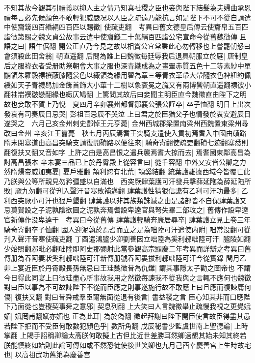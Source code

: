 不知其故今觀其引禮義以抑人主之情乃知真社稷之臣也妾與陛下結髮為夫婦曲承恩禮每言必先候顔色不敢輕犯威嚴况以人臣之疏遠乃能抗言如是陛下不可不從自請遣中使齎錢四百緍絹四百匹以賜徵|{
	使疏吏翻　考異曰舊文德皇后傳云使齎帛五百匹詣徵第賜之魏文貞公故事云遣中使齎錢二十萬絹百匹詣公宅宣命今從舊魏徵傳}
且語之曰|{
	語牛倨翻}
開公正直乃今見之故以相賞公宜常秉此心勿轉移也上嘗罷朝怒曰會須殺此田舍翁|{
	朝直遥翻}
后問為誰上曰魏徵每廷辱我后退具朝服立於庭|{
	唐制皇后之服褘衣者受册助祭朝會大事之服也深青織成為之畫翬赤質五色十二等素紗中單黼領朱羅縠褾襈蔽膝隨裳色以緅領為緣用翟為章三等青衣革帶大帶隨衣色裨紐約佩綬如天子青襪舄加金飾首飾大小華十二樹以象衮冕之旒又有兩博鬢朝直遥翻褾彼小翻袖耑襈皺戀翻緣也緅仄鳩翻}
上驚問其故后曰妾聞主明臣直今魏徵直由陛下之明故也妾敢不賀上乃悅　夏四月辛卯襄州都督鄒襄公張公謹卒|{
	卒子恤翻}
明日上出次發哀有司奏辰日忌哭|{
	彭祖百忌辰不哭泣}
上曰君之於臣猶父子也情發於衷安避辰日遂哭之　六月己亥金州刺史酆悼王元亨薨|{
	金州西城郡梁置南梁州西魏置東梁州尋改曰金州}
辛亥江王囂薨　秋七月丙辰焉耆王突騎支遣使入貢初焉耆入中國由磧路隋末閉塞道由高昌突騎支請復開磧路以便往來|{
	騎奇寄翻使疏吏翻磧七迹翻塞悉則翻復扶又翻又音如字}
上許之由是高昌恨之遣兵襲焉耆大掠而去|{
	焉耆國東鄰高昌為討高昌張本}
辛未宴三品已上於丹霄殿上從容言曰|{
	從千容翻}
中外乂安皆公卿之力然隋煬帝威加夷夏|{
	夏戶雅翻}
頡利跨有北荒|{
	頡奚結翻}
統葉護雄據西域今皆覆亡此乃朕與公等所親見勿矜彊盛以自滿也　西突厥肆葉護可汗發兵擊薛延陁為薛延陁所敗|{
	厥九勿翻可從刋入聲汗音寒敗補邁翻}
肆葉護性猜狠信讒有乙利可汗功最多|{
	乙利西突厥小可汗也狠戶墾翻}
肆葉護以非其族類誅滅之由是諸部皆不自保肆葉護又忌莫賀設之子泥孰陰欲圖之泥孰奔焉耆設卑逵官與弩失畢二部攻之|{
	舊傳作設卑逵官新傳作没卑逵干　考異曰今從舊傳}
肆葉護輕騎奔康居尋卒|{
	肆葉護立見上卷三年騎奇寄翻卒子恤翻}
國人迎泥孰於焉耆而立之是為咄陸可汗遣使内附|{
	咄常没翻可從刋入聲汗音寒使疏吏翻}
丁酉遣鴻臚少卿劉善因立咄陸為奚利邲咄陸可汗|{
	臚陵如翻少始照翻邲毗必翻咄陸即阿史那彌射此當參觀高宗顯慶二年考異而詳辯之考異曰舊傳册為吞阿妻狀奚利邲咄陸可汗新傳册號吞阿婁拔利邲咄陸可汗今從實錄}
閏月乙卯上宴近臣於丹霄殿長孫無忌曰王珪魏徵昔為仇讎|{
	謂其事隱太子勸之圖帝也}
不謂今日得此同宴上曰徵珪盡心所事故我用之然徵每諫我不從我與之言輒不應何也魏徵對曰臣以事為不可故諫陛下不從而臣應之則事遂施行故不敢應上曰且應而復諫庸何傷|{
	復扶又翻}
對曰昔舜戒羣臣爾無面從退有後言|{
	書益稷之言}
臣心知其非而口應陛下乃面從也豈稷契事舜之意邪|{
	契息列翻}
上大笑曰人言魏徵舉止疏慢我視之更覺娬媚|{
	娬罔甫翻娬亦媚也}
正為此耳|{
	為於偽翻}
徵起拜謝曰陛下開臣使言故臣得盡其愚若陛下拒而不受臣何敢數犯顔色乎|{
	數所角翻}
戊辰秘書少監虞世南上聖德論|{
	上時掌翻}
上賜手詔稱卿論太高朕何敢擬上古但比近世差勝耳然卿適覩其始未知其終若朕能慎終如始則此論可傳如或不然恐徒使後世笑卿也九月己酉幸慶善宫上生時故宅也|{
	以高祖武功舊第為慶善宫}


